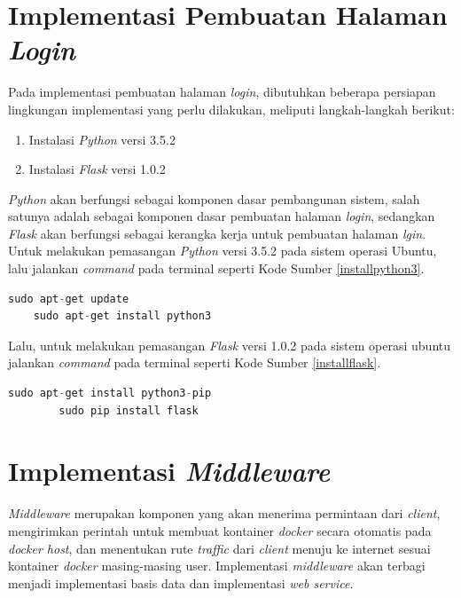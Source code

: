   \section{Implementasi Pembuatan Halaman \textit{Login}}
  Pada implementasi pembuatan halaman \textit{login}, dibutuhkan beberapa persiapan lingkungan implementasi yang perlu dilakukan, meliputi langkah-langkah berikut:
  \begin{enumerate}
  	\item Instalasi \textit{Python} versi 3.5.2
  	\item Instalasi \textit{Flask} versi 1.0.2
  \end{enumerate}
  \textit{Python} akan berfungsi sebagai komponen dasar pembangunan sistem, salah satunya adalah sebagai komponen dasar pembuatan halaman \textit{login}, sedangkan \textit{Flask} akan berfungsi sebagai kerangka kerja untuk pembuatan halaman \textit{lgin}. Untuk melakukan pemasangan \textit{Python} versi 3.5.2 pada sistem operasi Ubuntu, lalu jalankan \textit{command} pada terminal seperti Kode Sumber \ref{installpython3}.\\
  \begin{minipage}{\linewidth}
  	\begin{lstlisting}[caption=Command untuk installasi Python,language=Python,label=installpython3]
  	sudo apt-get update
  	sudo apt-get install python3
  	\end{lstlisting}
  \end{minipage}
  Lalu, untuk melakukan pemasangan \textit{Flask} versi 1.0.2 pada sistem operasi ubuntu jalankan \textit{command} pada terminal seperti Kode Sumber \ref{installflask}.\\
	\begin{minipage}{\linewidth}
	   	\begin{lstlisting}[caption=Command untuk installasi Flask,language=Python,label=installflask]
	   	sudo apt-get install python3-pip
	   	sudo pip install flask
	   	\end{lstlisting}
	\end{minipage}
	
  \section{Implementasi \textit{Middleware}}
  \textit{Middleware} merupakan komponen yang akan menerima permintaan dari \textit{client}, mengirimkan perintah untuk membuat kontainer \textit{docker} secara otomatis pada \textit{docker host}, dan menentukan rute \textit{traffic} dari \textit{client} menuju ke internet sesuai kontainer \textit{docker} masing-masing user. Implementasi \textit{middleware} akan terbagi menjadi implementasi basis data dan implementasi \textit{web service}.
